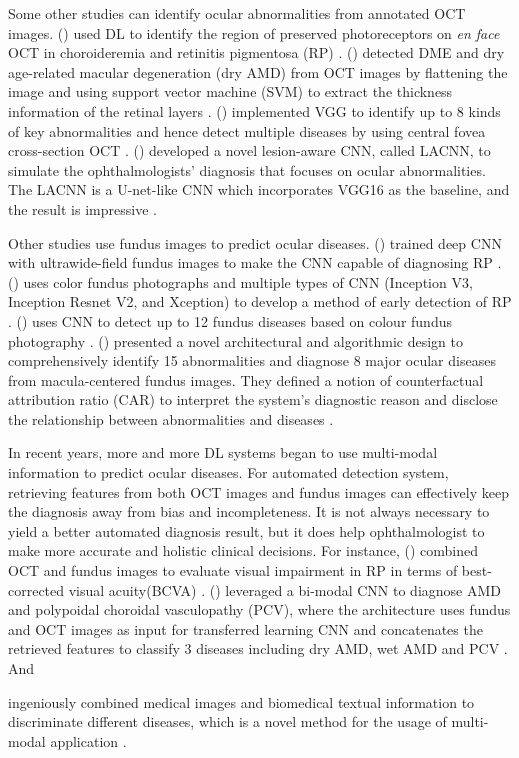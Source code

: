 \documentclass{article}
\newcommand{\authyear}[1]{\citeauthor{#1} (\citeyear{#1})}
\begin{document}
		Some other studies can identify ocular abnormalities from annotated OCT images.
		\authyear{camino2018deep} used DL to identify the region of preserved photoreceptors on \textit{en face} OCT in choroideremia and retinitis pigmentosa (RP) \autocite{camino2018deep}. 
		\authyear{srinivasan2014fully} detected DME and dry age-related macular degeneration (dry AMD) from OCT images by flattening the image and using support vector machine (SVM) to extract the thickness information of the retinal layers \autocite{srinivasan2014fully}. 
		\authyear{leandro2023oct} implemented VGG to identify up to 8 kinds of key abnormalities and hence detect multiple diseases by using central fovea cross-section OCT \autocite{leandro2023oct}.  \authyear{Fang_Wang2019} developed a novel lesion-aware CNN, called LACNN, to simulate the ophthalmologists' diagnosis that focuses on ocular abnormalities.  The LACNN is a U-net-like CNN which incorporates VGG16 as the baseline, and the result is impressive \autocite{Fang_Wang2019}.
		
		Other studies use fundus images to predict ocular diseases.
		\authyear{masumoto2019accuracy} trained deep CNN with ultrawide-field fundus images to make the CNN capable of diagnosing RP \autocite{masumoto2019accuracy}. 
		\authyear{chen2021artificial} uses color fundus photographs and multiple types of CNN (Inception V3, Inception Resnet V2, and Xception) to develop a method of early detection of RP \autocite{chen2021artificial}. 
		\authyear{li2022development} uses CNN to detect up to 12 fundus diseases based on colour fundus photography \autocite{li2022development}.  \authyear{Son2023} presented a novel architectural and algorithmic design to comprehensively identify 15 abnormalities and diagnose 8 major ocular diseases from macula-centered fundus images.  They defined a notion of counterfactual attribution ratio (CAR) to interpret the system's diagnostic reason and disclose the relationship between abnormalities and diseases \autocite{Son2023}.
		
		In recent years, more and more DL systems began to use multi-modal information to predict ocular diseases.  For automated detection system, retrieving features from both OCT images and fundus images can effectively keep the diagnosis away from bias and incompleteness.  It is not always necessary to yield a better automated diagnosis result, but it does help ophthalmologist to make more accurate and holistic clinical decisions.  For instance, \authyear{liu2023prediction} combined OCT and fundus images to evaluate visual impairment in RP in terms of best-corrected visual acuity(BCVA) \autocite{liu2023prediction}.  \authyear{Xu2021} leveraged a bi-modal CNN to diagnose AMD and polypoidal choroidal vasculopathy (PCV), where the architecture uses fundus and OCT images as input for transferred learning CNN and concatenates the retrieved features to classify 3 diseases including dry AMD, wet AMD and PCV \autocite{Xu2021}.  And \author{Andrearczyk2018} ingeniously combined medical images and biomedical textual information to discriminate different diseases, which is a novel method for the usage of multi-modal application \autocite{Andrearczyk2018}.
		
\end{document}
